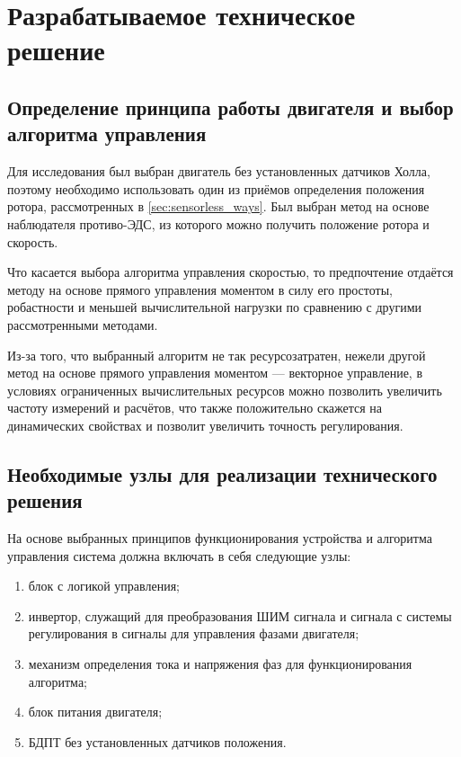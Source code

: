 \chapter{Разрабатываемое техническое решение}
\label{cha:chap3}

\section{Определение принципа работы двигателя и выбор алгоритма управления}

Для исследования был выбран двигатель без установленных датчиков Холла, поэтому необходимо использовать один из приёмов определения положения ротора, рассмотренных в \ref{sec:sensorless_ways}. Был выбран метод на основе наблюдателя противо-ЭДС, из которого можно получить положение ротора и скорость.

Что касается выбора алгоритма управления скоростью, то предпочтение отдаётся методу на основе прямого управления моментом в силу его простоты, робастности и меньшей вычислительной нагрузки по сравнению с другими рассмотренными методами.

Из-за того, что выбранный алгоритм не так ресурсозатратен, нежели другой метод на основе прямого управления моментом --- векторное управление, в условиях ограниченных вычислительных ресурсов можно позволить увеличить частоту измерений и расчётов, что также положительно скажется на динамических свойствах и позволит увеличить точность регулирования.

\section{Необходимые узлы для реализации технического решения}
\label{sec:nodes}

На основе выбранных принципов функционирования устройства и алгоритма управления система должна включать в себя следующие узлы:
\begin{enumerate}
	\item блок с логикой управления;
	\item инвертор, служащий для преобразования ШИМ сигнала и сигнала с системы регулирования в сигналы для управления фазами двигателя;
	\item механизм определения тока и напряжения фаз для функционирования алгоритма;
	\item блок питания двигателя;
	\item БДПТ без установленных датчиков положения.
\end{enumerate}
